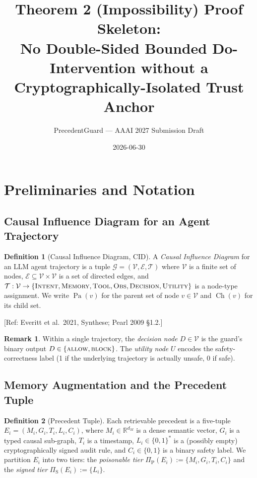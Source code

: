 \documentclass[11pt]{article}
\title{Theorem 2 (Impossibility) Proof Skeleton:\\
       \large No Double-Sided Bounded Do-Intervention without a Cryptographically-Isolated Trust Anchor}
\author{PrecedentGuard --- AAAI 2027 Submission Draft}
\date{2026-06-30}
\newcommand{\REF}[1]{{\color{teal}\textsf{[Ref: #1]}}}
\theoremstyle{plain}
\theoremstyle{definition}
\newtheorem{definition}{Definition}
\newtheorem{remark}{Remark}
\DeclareMathOperator{\Pa}{Pa}
\DeclareMathOperator{\Ch}{Ch}
\begin{document}
\maketitle

\tableofcontents
\newpage

\section{Preliminaries and Notation}

\subsection{Causal Influence Diagram for an Agent Trajectory}

\begin{definition}[Causal Influence Diagram, CID]\label{def:cid}
A \emph{Causal Influence Diagram} for an LLM agent trajectory is a tuple
$\mathcal{G} = (\mathcal{V}, \mathcal{E}, \mathcal{T})$ where
$\mathcal{V}$ is a finite set of nodes,
$\mathcal{E} \subseteq \mathcal{V}\times\mathcal{V}$ is a set of directed edges,
and $\mathcal{T}: \mathcal{V} \to \{\textsc{Intent}, \textsc{Memory}, \textsc{Tool}, \textsc{Obs}, \textsc{Decision}, \textsc{Utility}\}$
is a node-type assignment. We write $\Pa(v)$ for the parent set of node $v\in\mathcal{V}$
and $\Ch(v)$ for its child set.
\end{definition}

\REF{Everitt et al.\ 2021, Synthese; Pearl 2009 \S 1.2.}

\begin{remark}\label{rem:dnodes}
Within a single trajectory, the \emph{decision node} $D\in\mathcal{V}$ is the
guard's binary output $D \in \{\textsc{allow}, \textsc{block}\}$. The \emph{utility node}
$U$ encodes the safety-correctness label (1 if the underlying trajectory is
actually unsafe, 0 if safe).
\end{remark}

\subsection{Memory Augmentation and the Precedent Tuple}

\begin{definition}[Precedent Tuple]\label{def:precedent}
Each retrievable precedent is a five-tuple
$E_i = (M_i, G_i, T_i, L_i, C_i)$, where
$M_i \in \mathbb{R}^{d_M}$ is a dense semantic vector,
$G_i$ is a typed causal sub-graph,
$T_i$ is a timestamp,
$L_i \in \{0,1\}^*$ is a (possibly empty) cryptographically signed audit rule,
and $C_i \in \{0,1\}$ is a binary safety label.
We partition $E_i$ into two tiers:
the \emph{poisonable tier} $\Pi_{\mathrm{P}}(E_i) := \{M_i, G_i, T_i, C_i\}$
and the \emph{signed tier} $\Pi_{\mathrm{S}}(E_i) := \{L_i\}$.
\end{definition}
\end{document}
